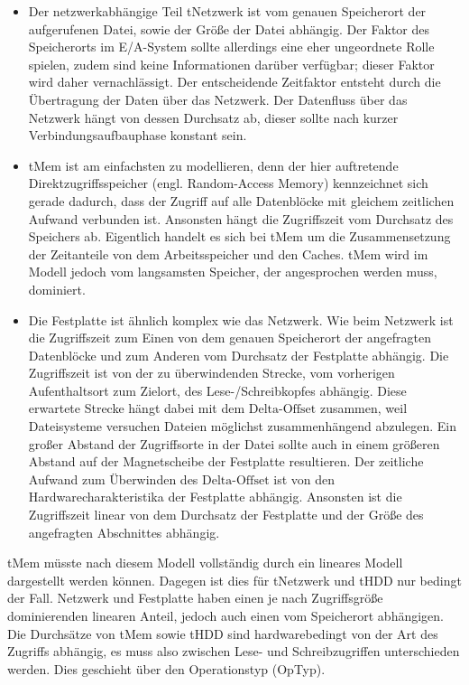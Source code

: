 \documentclass[
	12pt,
	a4paper,
	BCOR10mm,
	DIV14,
	listof=totoc,
	bibliography=totoc,
	headsepline
]{scrreprt}
\begin{document}
\begin{itemize}
	\item Der netzwerkabhängige Teil tNetzwerk ist vom genauen Speicherort der aufgerufenen Datei, sowie der Größe der Datei abhängig. Der Faktor des Speicherorts im E/A-System sollte allerdings eine eher ungeordnete Rolle spielen, zudem sind keine Informationen darüber verfügbar; dieser Faktor wird daher vernachlässigt. 
	Der entscheidende Zeitfaktor entsteht durch die Übertragung der Daten über das Netzwerk. Der Datenfluss über das Netzwerk hängt von dessen Durchsatz ab, dieser sollte nach kurzer Verbindungsaufbauphase konstant sein.
	\item tMem ist am einfachsten zu modellieren, denn der hier auftretende Direktzugriffsspeicher (engl. Random-Access Memory) kennzeichnet sich gerade dadurch, dass der Zugriff auf alle Datenblöcke mit gleichem zeitlichen Aufwand verbunden ist.
	Ansonsten hängt die Zugriffszeit vom Durchsatz des Speichers ab.
	Eigentlich handelt es sich bei tMem um die Zusammensetzung der Zeitanteile von dem Arbeitsspeicher und den Caches. tMem wird im Modell jedoch vom langsamsten Speicher, der angesprochen werden muss, dominiert.
	\item Die Festplatte ist ähnlich komplex wie das Netzwerk. Wie beim Netzwerk ist die Zugriffszeit zum Einen von dem genauen Speicherort der angefragten Datenblöcke und zum Anderen vom Durchsatz der Festplatte abhängig.
	Die Zugriffszeit ist von der zu überwindenden Strecke, vom vorherigen Aufenthaltsort zum Zielort, des Lese-/Schreibkopfes abhängig.
	Diese erwartete Strecke hängt dabei mit dem $\mbox{Delta-Offset}$ zusammen, weil Dateisysteme versuchen Dateien möglichst zusammenhängend abzulegen.
	Ein großer Abstand der Zugriffsorte in der Datei sollte auch in einem größeren Abstand auf der Magnetscheibe der Festplatte resultieren.
	Der zeitliche Aufwand zum Überwinden des $\mbox{Delta-Offset}$ ist von den Hardwarecharakteristika der Festplatte abhängig. Ansonsten ist die Zugriffszeit linear von dem Durchsatz der Festplatte und der Größe des angefragten Abschnittes abhängig.
\end{itemize}

tMem müsste nach diesem Modell vollständig durch ein lineares Modell dargestellt werden können. Dagegen ist dies für tNetzwerk und tHDD nur bedingt der Fall.
Netzwerk und Festplatte haben einen je nach Zugriffsgröße dominierenden linearen Anteil, jedoch auch einen vom Speicherort abhängigen.
Die Durchsätze von tMem sowie tHDD sind hardwarebedingt von der Art des Zugriffs abhängig, es muss also zwischen Lese- und Schreibzugriffen unterschieden werden.
Dies geschieht über den Operationstyp (OpTyp).
\end{document}

